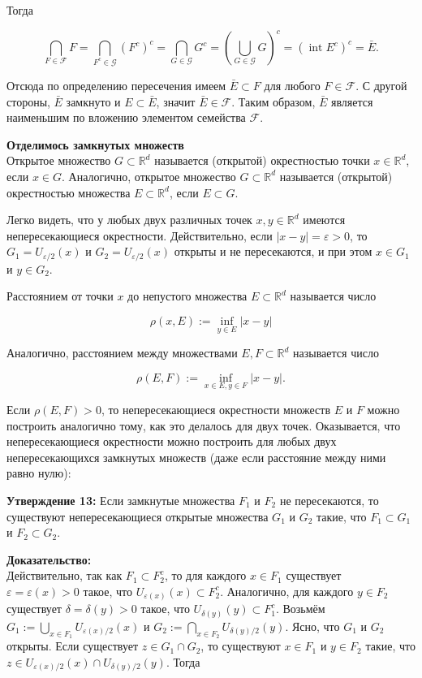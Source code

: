 \documentclass[a4paper,12pt]{article} %
\begin{document}
Тогда

$$
\bigcap_{F \in \mathscr{F}} F=\bigcap_{F^{c} \in \mathscr{G}}\left(F^{c}\right)^{c}=\bigcap_{G \in \mathscr{G}} G^{c}=\left(\bigcup_{G \in \mathscr{G}} G\right)^{c}=\left(\operatorname{int} E^{c}\right)^{c}=\bar{E} .
$$

Отсюда по определению пересечения имеем $\bar{E} \subset F$ для любого $F \in \mathscr{F}$. С другой стороны, $\bar{E}$ замкнуто и $E \subset \bar{E}$, значит $\bar{E} \in \mathscr{F}$. Таким образом, $\bar{E}$ является наименьшим по вложению элементом семейства $\mathscr{F}$.

\textbf{Отделимось замкнутых множеств}\\
Открытое множество $G \subset \mathbb{R}^{d}$ называется (открытой) окрестностью точки $x \in \mathbb{R}^{d}$, если $x \in G$. Аналогично, открытое множество $G \subset \mathbb{R}^{d}$ называется (открытой) окрестностью множества $E \subset \mathbb{R}^{d}$, если $E \subset G$.

Легко видеть, что у любых двух различных точек $x, y \in \mathbb{R}^{d}$ имеются непересекающиеся окрестности. Действительно, если $|x-y|=\varepsilon>0$, то $G_{1}=U_{\varepsilon / 2}(x)$ и $G_{2}=U_{\varepsilon / 2}(x)$ открыты и не пересекаются, и при этом $x \in G_{1}$ и $y \in G_{2}$.

Расстоянием от точки $x$ до непустого множества $E \subset \mathbb{R}^{d}$ называется число

$$
\rho(x, E):=\inf _{y \in E}|x-y|
$$

Аналогично, расстоянием между множествами $E, F \subset \mathbb{R}^{d}$ называется число

$$
\rho(E, F):=\inf _{x \in E, y \in F}|x-y| .
$$

Если $\rho(E, F)>0$, то непересекающиеся окрестности множеств $E$ и $F$ можно построить аналогично тому, как это делалось для двух точек. Оказывается, что непересекающиеся окрестности можно построить для любых двух непересекающихся замкнутых множеств (даже если расстояние между ними равно нулю):

\textbf{Утверждение 13:} Если замкнутые множества $F_{1}$ и $F_{2}$ не пересекаются, то существуют непересекающиеся открытые множества $G_{1}$ и $G_{2}$ такие, что $F_{1} \subset G_{1}$ и $F_{2} \subset G_{2}$.

\textbf{Доказательство:}\\
Действительно, так как $F_{1} \subset F_{2}^{c}$, то для каждого $x \in F_{1}$ существует $\varepsilon=\varepsilon(x)>0$ такое, что $U_{\varepsilon(x)}(x) \subset F_{2}^{c}$. Аналогично, для каждого $y \in F_{2}$ существует $\delta=\delta(y)>0$ такое, что $U_{\delta(y)}(y) \subset F_{1}^{c}$. Возьмём $G_{1}:=\bigcup_{x \in F_{1}} U_{\varepsilon(x) / 2}(x)$ и $G_{2}:=\bigcap_{x \in F_{2}} U_{\delta(y) / 2}(y)$. Ясно, что $G_{1}$ и $G_{2}$ открыты. Если существует $z \in G_{1} \cap G_{2}$, то существуют $x \in F_{1}$ и $y \in F_{2}$ такие, что $z \in U_{\varepsilon(x) / 2}(x) \cap U_{\delta(y) / 2}(y)$. Тогда
\end{document}
